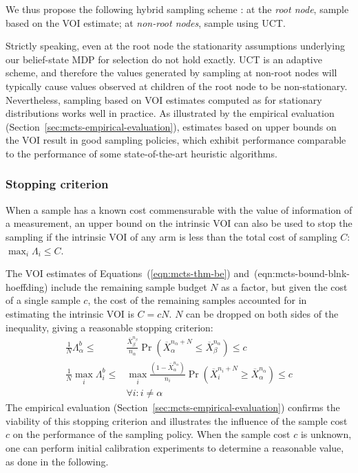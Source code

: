 We thus propose the following hybrid sampling scheme \cite{TolpinShimony.mcts}: 
	at the \emph{root node}, sample based on the VOI estimate;
	at \emph{non-root nodes}, sample using UCT.

Strictly speaking, even at the root node the stationarity assumptions
underlying our belief-state MDP for selection do not hold exactly. UCT
is an adaptive scheme, and therefore the values generated by sampling
at non-root nodes will typically cause values observed at children of
the root node to be non-stationary.  Nevertheless, sampling based on
VOI estimates computed as for stationary distributions works well in
practice. As illustrated by the empirical evaluation
(Section~\ref{sec:mcts-empirical-evaluation}), estimates based on
upper bounds on the VOI result in good sampling policies, which
exhibit performance comparable to the performance of some
state-of-the-art heuristic algorithms.


\subsubsection{Stopping criterion}
\label{sec:mcts-control-stopping-criterion}

When a sample has a known cost commensurable with the value of
information of a measurement, an upper bound on the intrinsic VOI can also
be used to stop the sampling if the intrinsic VOI of any arm
is less than the total cost of sampling $C$: $\max_i \Lambda_i \le C$.

The VOI estimates of Equations~(\ref{eqn:mcts-thm-be}) and~({eqn:mcts-bound-blnk-hoeffding})
include the remaining sample budget $N$ as a
factor, but given the cost of a single sample $c$, the cost of the
remaining samples accounted for in estimating the intrinsic VOI is
$C=cN$. $N$ can be dropped on both sides of the inequality,
giving a reasonable stopping criterion:
\begin{align}
\frac 1 N \Lambda_\alpha^b \le&\frac {\overline X_\beta^{n_\beta}}
  {n_\alpha}\Pr(\overline X_\alpha^{n_\alpha+N}\le\overline
  X_\beta^{n_\alpha})\le c\nonumber\\
\frac 1 N \max_i\Lambda_i^b\le &\max_i\frac {(1-\overline X_\alpha^{n_\alpha})} {n_i}\Pr(\overline
  X_i^{n_i+N}\ge\overline X_\alpha^{n_\alpha})\le c\nonumber\\
    &\forall i: i\ne\alpha
\label{eqn:mcts-stopping-blnk}
\end{align}
The empirical evaluation (Section~\ref{sec:mcts-empirical-evaluation})
confirms the viability of this stopping criterion and illustrates the
influence of the sample cost $c$ on the performance of
the sampling policy. When the sample cost $c$ is unknown, one can perform initial calibration experiments
to determine a reasonable value, as done in the following.

